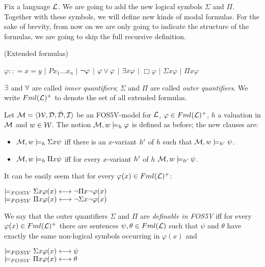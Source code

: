 \qquad Fix a language $\mathcal{L}$. We are going to add the new logical symbols $\Sigma$ and $\Pi$. Together with these symbols, we will define new kinds of modal formulas. For the sake of brevity, from now on we are only going to indicate the structure of the formulas, we are going to skip the full recursive definition.  


\begin{defn} (Extended formulas)
	\begin{center}
		$ \varphi :: = x =y$ $|$ $Px_1 \dots x_n$ $|$ $\neg \varphi$ $|$ $\varphi \vee \varphi$ $|$ $\exists x \varphi$ $|$  $\Box \varphi$ $|$ $\Sigma x \varphi$ $|$ $\Pi x \varphi$
	\end{center}
\end{defn}

\qquad $\exists$ and $\forall$ are called \textit{inner quantifiers}; $\Sigma$ and $\Pi$ are called \textit{outer quantifiers}. We write $Fml(\mathcal{L})^{+}$ to denote the set of all extended formulas.


\begin{defn}
	Let $\mathcal{M} = \langle\mathcal{W},\mathcal{D}, \bar{\mathcal{D}},\mathcal{I}\rangle$ be an FOS5V-model for $\mathcal{L}$, $\varphi \in Fml(\mathcal{L})^{+}$, $h$ a valuation in $\mathcal{M}$ and $w \in \mathcal{W}$. The notion $\mathcal{M},w \models_{h} \varphi$ is defined as before; the new clauses are:
	
	\begin{itemize} 

		\item[] $\mathcal{M},w \models_{h} \Sigma x \psi$ iff there is an $x$-variant $h^{\prime}$ of $h$ such that $\mathcal{M},w \models_{h^{\prime}} \psi$.
		
		\item[] $\mathcal{M},w \models_{h} \Pi x \psi$ iff for every $x$-variant $h^{\prime}$ of $h$  $\mathcal{M},w \models_{h^{\prime}} \psi$.
		
	\end{itemize}

\end{defn}


\qquad It can be easily seem that for every $\varphi(x) \in Fml(\mathcal{L})^{+}$:


\begin{center}
	$ \models_{FOS5V} \Sigma x \varphi(x) \longleftrightarrow \neg \Pi x \neg \varphi(x)$\\
	$ \models_{FOS5V} \Pi x \varphi(x) \longleftrightarrow \neg \Sigma x \neg \varphi(x)$
\end{center}

\begin{defn}
We say that the outer quantifiers $\Sigma$ and $\Pi$ are \textit{definable in FOS5V} iff for every $\varphi (x) \in Fml(\mathcal{L})^{+}$ there are sentences $\psi,\theta\in Fml(\mathcal{L})$ such that $\psi$ and $\theta$ have exactly the same non-logical symbols occurring in $\varphi (x)$ and 


\begin{center}
	$ \models_{FOS5V} \Sigma x \varphi(x) \longleftrightarrow \psi$\\
	$ \models_{FOS5V} \Pi x \varphi(x) \longleftrightarrow \theta$
\end{center}
\end{defn}


